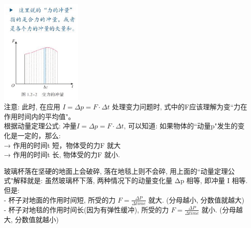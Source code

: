 \documentclass[UTF8]{ctexart}
\begin{document}
\includegraphics[width=0.3\textwidth]{img/0105.png}\\

注意: 此时, 在应用 $I= \Delta p = F \cdot \Delta t$  处理变力问题时, 式中的F应该理解为变``力在作用时间内的平均值"。 \\

根据动量定理公式: $\text{冲量}I= \Delta p = F \cdot \Delta t$, 可以知道: 如果物体的``动量p"发生的变化是一定的，那么: \\
→ 作用的时间t 短，物体受的力F 就大 \\
→ 作用的时间t 长, 物体受的力F 就小. \\

\begin{myEnvSample}
玻璃杯落在坚硬的地面上会破碎, 落在地毯上则不会碎, 用上面的``动量定理公式"解释就是: 虽然玻璃杯下落, 两种情况下的动量变化量 Δp 相等, 即冲量 I 相等. 但是: \\
- 杯子对地面的作用时间短, 所受的力 $F=\frac{\varDelta P}{\varDelta time}$ 就大. (分母越小, 分数值就越大) \\
- 杯子对地毯的作用时间长(因为有弹性缓冲), 所受的力 $F=\frac{\varDelta P}{\varDelta time}$ 就小. (分母越大, 分数值就越小) 
\end{myEnvSample}
\end{document}
